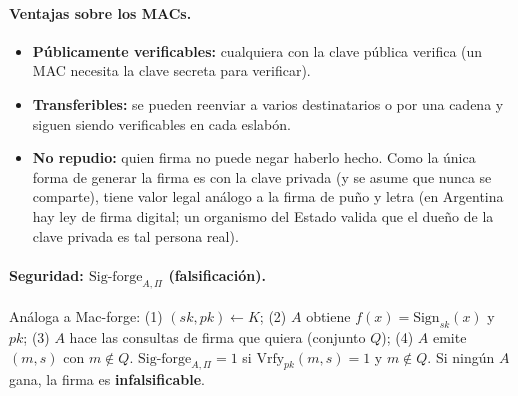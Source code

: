 \documentclass[../main.tex]{subfiles}
\begin{document}
\begin{center}
\end{center}

\paragraph{Ventajas sobre los MACs.}
\begin{itemize}[leftmargin=1.4em,nosep]
  \item \textbf{Públicamente verificables:} cualquiera con la clave pública verifica
  (un MAC necesita la clave secreta para verificar).
  \item \textbf{Transferibles:} se pueden reenviar a varios destinatarios o por una
  cadena y siguen siendo verificables en cada eslabón.
  \item \textbf{No repudio:} quien firma no puede negar haberlo hecho. Como la única
  forma de generar la firma es con la clave privada (y se asume que nunca se
  comparte), tiene valor legal análogo a la firma de puño y letra (en Argentina hay
  ley de firma digital; un organismo del Estado valida que el dueño de la clave
  privada es tal persona real).
\end{itemize}

\paragraph{Seguridad: $\mathrm{Sig\text{-}forge}_{A,\Pi}$ (falsificación).}
Análoga a Mac-forge: (1) $(sk,pk)\leftarrow K$; (2) $A$ obtiene
$f(x)=\mathrm{Sign}_{sk}(x)$ y \textbf{$pk$}; (3) $A$ hace las consultas de firma que
quiera (conjunto $Q$); (4) $A$ emite $(m,s)$ con $m\notin Q$.
$\mathrm{Sig\text{-}forge}_{A,\Pi}=1$ si $\mathrm{Vrfy}_{pk}(m,s)=1$ y $m\notin Q$.
Si ningún $A$ gana, la firma es \textbf{infalsificable}.
\end{document}
